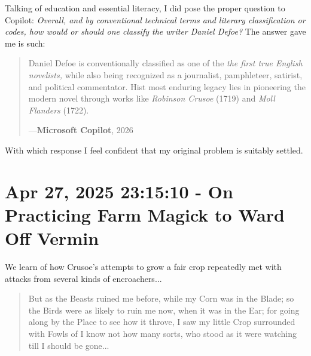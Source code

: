 \documentclass[a4paper]{article}
\begin{document}
Talking of education and essential literacy, I did pose the proper question to Copilot: \textit{Overall, and by conventional technical terms and literary classification or codes, how would or should one classify the writer Daniel Defoe?} The answer \cite{copilot_assistant} gave me is such:

\noindent
\begin{minipage}{1\textwidth}
\vspace{1em}
\begin{quotation}
{\ttfamily

Daniel Defoe is conventionally classified as one of the \textit{the first true English novelists,} while also being recognized as a journalist, pamphleteer, satirist, and political commentator. Hist most enduring legacy lies in pioneering the modern novel through works like \textit{Robinson Crusoe} (1719) and \textit{Moll Flanders} (1722).

}
\hspace*{\fill} ---\textbf{Microsoft Copilot}, 2026\cite{copilot_assistant}
\end{quotation}
\vspace{1em}
\end{minipage}


With which response I feel confident that my original problem is suitably settled. 


\section{Apr 27, 2025 23:15:10 - On Practicing Farm Magick to Ward Off Vermin}
\label{SEC22}


We learn of how Crusoe's attempts to grow a fair crop repeatedly met with attacks from several kinds of encroachers...

\noindent
\begin{minipage}{1\textwidth}
\vspace{1em}
\begin{quotation}
{\ttfamily


But as the Beasts ruined me before, while my Corn was in the Blade; so the Birds were as likely to ruin me now, when it was in the Ear; for going along by the Place to see how it throve, I saw my little Crop surrounded with Fowls of I know not how many sorts, who stood as it were watching till I should be gone...


}
\end{quotation}
\vspace{1em}
\end{minipage}
\end{document}
